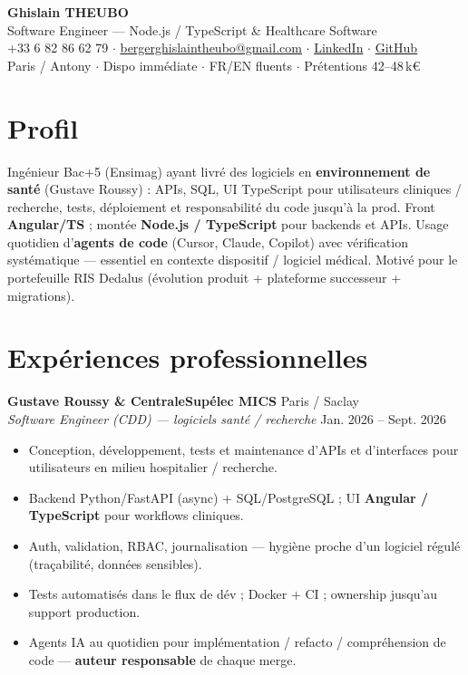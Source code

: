 \documentclass[10pt,a4paper]{article}
\begin{document}
\begin{center}
{\LARGE\bfseries Ghislain THEUBO}\\[2pt]
{\large Software Engineer --- Node.js / TypeScript \& Healthcare Software}\\[3pt]
+33 6 82 86 62 79 $\cdot$
\href{mailto:bergerghislaintheubo@gmail.com}{bergerghislaintheubo@gmail.com} $\cdot$
\href{https://www.linkedin.com/in/berger-ghislain}{LinkedIn} $\cdot$
\href{https://github.com/Bergerghislain}{GitHub}\\[1pt]
Paris / Antony $\cdot$ Dispo imm\'ediate $\cdot$ FR/EN fluents $\cdot$ Pr\'etentions 42--48\,k€
\end{center}

\section{Profil}
Ing\'enieur Bac+5 (Ensimag) ayant livr\'e des logiciels en \textbf{environnement de sant\'e} (Gustave Roussy) : APIs, SQL, UI TypeScript pour utilisateurs cliniques / recherche, tests, d\'eploiement et responsabilit\'e du code jusqu'\`a la prod. Front \textbf{Angular/TS} ; mont\'ee \textbf{Node.js / TypeScript} pour backends et APIs. Usage quotidien d'\textbf{agents de code} (Cursor, Claude, Copilot) avec v\'erification syst\'ematique --- essentiel en contexte dispositif / logiciel m\'edical. Motiv\'e pour le portefeuille RIS Dedalus (\'evolution produit + plateforme successeur + migrations).

\section{Exp\'eriences professionnelles}
\textbf{Gustave Roussy \& CentraleSup\'elec MICS} \hfill Paris / Saclay\\
\textit{Software Engineer (CDD) --- logiciels sant\'e / recherche} \hfill Jan. 2026 -- Sept. 2026
\begin{itemize}
  \item Conception, d\'eveloppement, tests et maintenance d'APIs et d'interfaces pour utilisateurs en milieu hospitalier / recherche.
  \item Backend Python/FastAPI (async) + SQL/PostgreSQL ; UI \textbf{Angular / TypeScript} pour workflows cliniques.
  \item Auth, validation, RBAC, journalisation --- hygi\`ene proche d'un logiciel r\'egul\'e (tra\c{c}abilit\'e, donn\'ees sensibles).
  \item Tests automatis\'es dans le flux de d\'ev ; Docker + CI ; ownership jusqu'au support production.
  \item Agents IA au quotidien pour impl\'ementation / refacto / compr\'ehension de code --- \textbf{auteur responsable} de chaque merge.
\end{itemize}
\end{document}
